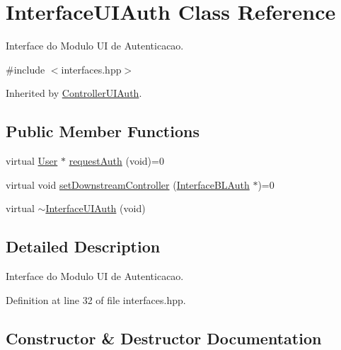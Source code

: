 \hypertarget{class_interface_u_i_auth}{}\section{Interface\+U\+I\+Auth Class Reference}
\label{class_interface_u_i_auth}


Interface do Modulo UI de Autenticacao.  




{\ttfamily \#include $<$interfaces.\+hpp$>$}



Inherited by \hyperlink{class_controller_u_i_auth}{Controller\+U\+I\+Auth}.

\subsection*{Public Member Functions}
\begin{DoxyCompactItemize}
\item 
virtual \hyperlink{class_user}{User} $\ast$ \hyperlink{class_interface_u_i_auth_aa1c72a24f846accc6417a3b866ec9095}{request\+Auth} (void)=0
\item 
virtual void \hyperlink{class_interface_u_i_auth_af955fb60079d683f906912feb540c3ec}{set\+Downstream\+Controller} (\hyperlink{class_interface_b_l_auth}{Interface\+B\+L\+Auth} $\ast$)=0
\item 
virtual \hyperlink{class_interface_u_i_auth_a7aa37095dff355ebaac8b93ccb3a2000}{$\sim$\+Interface\+U\+I\+Auth} (void)
\end{DoxyCompactItemize}


\subsection{Detailed Description}
Interface do Modulo UI de Autenticacao. 

Definition at line 32 of file interfaces.\+hpp.



\subsection{Constructor \& Destructor Documentation}
\mbox{\label{class_interface_u_i_auth_a7aa37095dff355ebaac8b93ccb3a2000}} 
